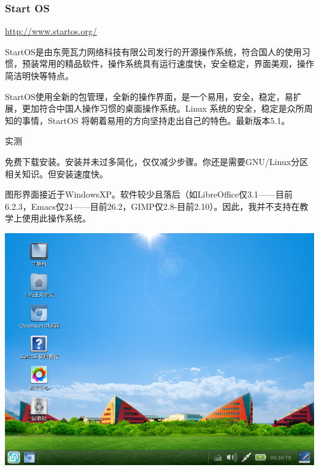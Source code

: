 \documentclass{book}
\begin{document}
\subsubsection{Start OS}
\url{http://www.startos.org/}\par
\cite{startosinfo} StartOS是由东莞瓦力网络科技有限公司发行的开源操作系统，符合国人的使用习惯，预装常用的精品软件，操作系统具有运行速度快，安全稳定，界面美观，操作简洁明快等特点。\par
StartOS使用全新的包管理，全新的操作界面，是一个易用，安全，稳定，易扩展，更加符合中国人操作习惯的桌面操作系统。Linux 系统的安全，稳定是众所周知的事情，StartOS 将朝着易用的方向坚持走出自己的特色。最新版本5.1。\par
\large 实测\par
\normalsize 免费下载安装。安装并未过多简化，仅仅减少步骤。你还是需要GNU/Linux分区相关知识。但安装速度快。\par
图形界面接近于WindowsXP。软件较少且落后（如LibreOffice仅3.1——目前6.2.3，Emacs仅24——目前26.2，GIMP仅2.8-目前2.10）。因此，我并不支持在教学上使用此操作系统。
\begin{center}
	\includegraphics[scale=0.5]{pic/startos}
\end{center}
\end{document}
